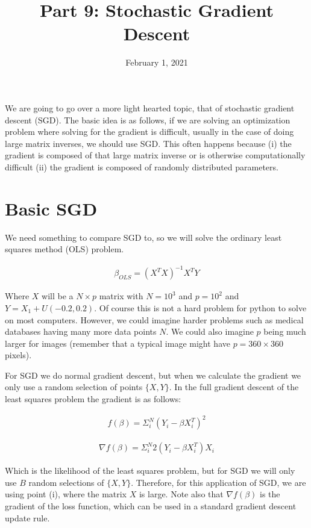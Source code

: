 \documentclass[12pt]{article}
\title{\textbf{Part 9: Stochastic Gradient Descent}}
\begin{document}
\date{February 1, 2021}
\maketitle

We are going to go over a more light hearted topic, that of stochastic gradient descent (SGD). The basic idea is as follows, if we are solving an optimization problem where solving for the gradient is difficult, usually in the case of doing large matrix inverses, we should use SGD. This often happens because (i) the gradient is composed of that large matrix inverse or is otherwise computationally difficult (ii) the gradient is composed of randomly distributed parameters.

\section{Basic SGD}

We need something to compare SGD to, so we will solve the ordinary least squares method (OLS) problem.

\begin{align*}
\beta_{OLS} = (X^T X)^{-1} X^T Y
\end{align*}

Where $X$ will be a $N \times p$ matrix with $N=10^3$ and $p=10^2$ and $Y=X_1+U(-0.2,0.2)$. Of course this is not a hard problem for python to solve on most computers. However, we could imagine harder problems such as medical databases having many more data points $N$. We could also imagine $p$ being much larger for images (remember that a typical image might have $p=360\times 360$ pixels).

\vspace{5mm}

For SGD we do normal gradient descent, but when we calculate the gradient we only use a random selection of points $\{X,Y\}$. In the full gradient descent of the least squares problem the gradient is as follows:

\begin{align*}
f(\beta)=\Sigma_i^N (Y_i-\beta X_i^T)^2
\end{align*}

\begin{align*}
\nabla f(\beta) = \Sigma_i^N 2(Y_i-\beta X_i^T) X_i
\end{align*}

\vspace{5mm}

Which is the likelihood of the least squares problem, but for SGD we will only use $B$ random selections of $\{X,Y\}$. Therefore, for this application of SGD, we are using point (i), where the matrix $X$ is large. Note also that $\nabla f(\beta)$ is the gradient of the loss function, which can be used in a standard gradient descent update rule.
 
\end{document}
